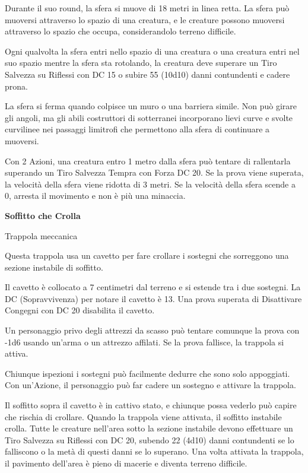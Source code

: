 \begin{multicols}{2}
Durante il suo round, la sfera si muove di 18 metri in linea retta. La sfera può muoversi attraverso lo spazio di una creatura, e le creature possono muoversi attraverso lo spazio che occupa, considerandolo terreno difficile.

Ogni qualvolta la sfera entri nello spazio di una creatura o una creatura entri nel suo spazio mentre la sfera sta rotolando, la creatura deve superare un Tiro Salvezza su Riflessi con DC 15 o subire 55 (10d10) danni contundenti e cadere prona.

La sfera si ferma quando colpisce un muro o una barriera simile. Non può girare gli angoli, ma gli abili costruttori di sotterranei incorporano lievi curve e svolte curvilinee nei passaggi limitrofi che permettono alla sfera di continuare a muoversi.

Con 2 Azioni, una creatura entro 1 metro dalla sfera può tentare di rallentarla superando un Tiro Salvezza Tempra con Forza DC 20. Se la prova viene superata, la velocità della sfera viene ridotta di 3 metri. Se la velocità della sfera scende a 0, arresta il movimento e non è più una minaccia.

\medskip

\textbf{Soffitto che Crolla}

Trappola meccanica

Questa trappola usa un cavetto per fare crollare i sostegni che sorreggono una sezione instabile di soffitto.

Il cavetto è collocato a 7 centimetri dal terreno e si estende tra i due sostegni. La DC (Sopravvivenza) per notare il cavetto è 13. Una prova superata di Disattivare Congegni con DC 20 disabilita il cavetto.

Un personaggio privo degli attrezzi da scasso può tentare comunque la prova con -1d6 usando un'arma o un attrezzo affilati. Se la prova fallisce, la trappola si attiva.

Chiunque ispezioni i sostegni può facilmente dedurre che sono solo appoggiati. Con un'Azione, il personaggio può far cadere un sostegno e attivare la trappola.

Il soffitto sopra il cavetto è in cattivo stato, e chiunque possa vederlo può capire che rischia di crollare. Quando la trappola viene attivata, il soffitto instabile crolla. Tutte le creature nell'area sotto la sezione instabile devono effettuare un Tiro Salvezza su Riflessi con DC 20, subendo 22 (4d10) danni contundenti se lo falliscono o la metà di questi danni se lo superano. Una volta attivata la trappola, il pavimento dell'area è pieno di macerie e diventa terreno difficile.


\end{multicols}
